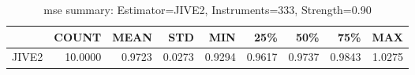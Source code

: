 \begin{table}[ht]
\centering
\caption{mse summary: Estimator=JIVE2, Instruments=333, Strength=0.90}
\begin{tabular}{lrrrrrrrr}
\toprule
 & COUNT & MEAN & STD & MIN & 25\% & 50\% & 75\% & MAX \\
\midrule
JIVE2 & 10.0000 & 0.9723 & 0.0273 & 0.9294 & 0.9617 & 0.9737 & 0.9843 & 1.0275 \\
\bottomrule
\end{tabular}
\end{table}
